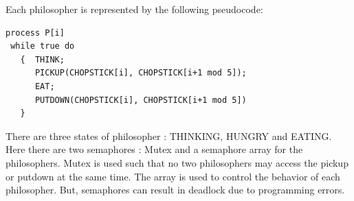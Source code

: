 \documentclass[8pt,landscape]{article}
\begin{document}
\begin{multicols}{3}
\begin{tiny}
Each philosopher is represented by the following pseudocode:

\begin{verbatim}
process P[i]
 while true do
   {  THINK;
      PICKUP(CHOPSTICK[i], CHOPSTICK[i+1 mod 5]);
      EAT;
      PUTDOWN(CHOPSTICK[i], CHOPSTICK[i+1 mod 5])
   }
\end{verbatim}

There are three states of philosopher : THINKING, HUNGRY and EATING. Here there are two semaphores : Mutex and a semaphore array for the philosophers. Mutex is used such that no two philosophers may access the pickup or putdown at the same time. The array is used to control the behavior of each philosopher. But, semaphores can result in deadlock due to programming errors.



\end{tiny}

\end{multicols}
\end{document}
